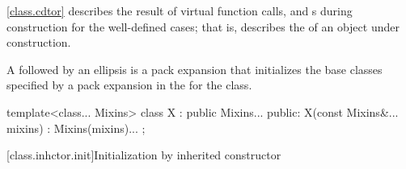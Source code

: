 \pnum
\begin{note}
\ref{class.cdtor} describes the result of virtual function calls,
and
s
during construction for the well-defined cases;
that is, describes the
of an object under construction.
\end{note}

\pnum
{}%
A  followed by an ellipsis is
a pack expansion that initializes the base
classes specified by a pack expansion in the 
for the class. \begin{example}

\begin{codeblock}
template<class... Mixins>
class X : public Mixins... {
public:
  X(const Mixins&... mixins) : Mixins(mixins)... { }
};
\end{codeblock}

\end{example}

[class.inhctor.init]{Initialization by inherited constructor}%


